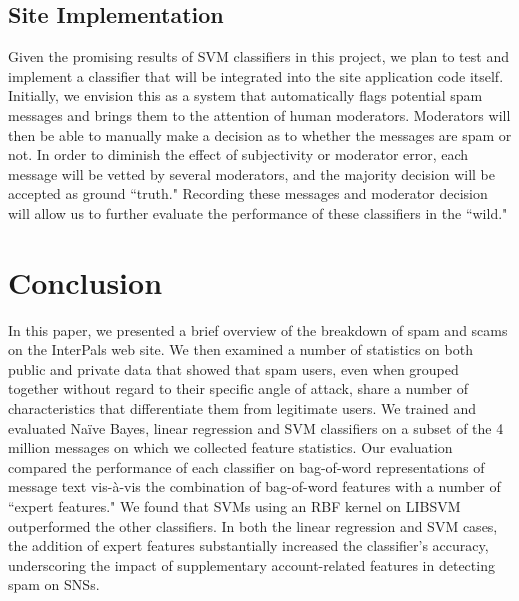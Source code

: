 \documentclass[preprint]{acm_proc_article-sp}
\begin{document}
\subsection{Site Implementation}

Given the promising results of SVM classifiers in this project, we plan to test and implement a classifier that will 
be integrated into the site application code itself. Initially, we envision this as a system that automatically flags 
potential spam messages and brings them to the attention of human moderators. Moderators will then be able to manually 
make a decision as to whether the messages are spam or not. In order to diminish the effect of subjectivity or moderator 
error, each message will be vetted by several moderators, and the majority decision will be accepted as ground ``truth." 
Recording these messages and moderator decision will allow us to further evaluate the performance of these classifiers in 
the ``wild."

\section{Conclusion}

In this paper, we presented a brief overview of the breakdown of spam and scams on the InterPals web site. 
We then examined a number of statistics on both public and private data that showed that spam users, even when 
grouped together without regard to their specific angle of attack, share a number of characteristics that differentiate 
them from legitimate users. We trained and evaluated Na\"ive Bayes, linear regression and SVM classifiers on a subset 
of the 4 million messages on which we collected feature statistics. Our evaluation compared the performance of 
each classifier on bag-of-word representations of message text vis-\`{a}-vis the combination of bag-of-word features 
with a number of ``expert features." We found that SVMs using an RBF kernel on LIBSVM outperformed the other 
classifiers. In both the linear regression and SVM cases, the addition of expert features substantially increased 
the classifier's accuracy, underscoring the impact of supplementary account-related features in detecting spam on 
SNSs.




\balancecolumns
\end{document}
